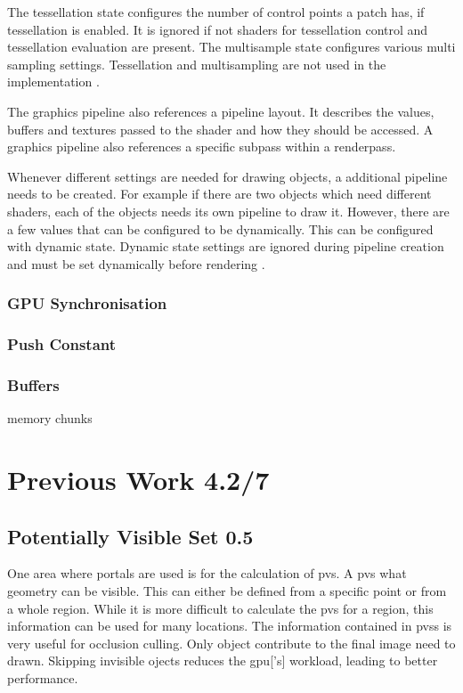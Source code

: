 The tessellation state configures the number of control points a patch has, if tessellation is enabled. It is ignored if not shaders for tessellation control and tessellation evaluation are present. The multisample state configures various multi sampling settings. Tessellation and multisampling are not used in the implementation \cite{khronos:vulkan:spec1.1}.

The graphics pipeline also references a pipeline layout. It describes the values, buffers and textures passed to the shader and how they should be accessed. A graphics pipeline also references a specific subpass within a renderpass\cite{khronos:vulkan:spec1.1}.

Whenever different settings are needed for drawing objects, a additional pipeline needs to be created. For example if there are two objects which need different shaders, each of the objects needs its own pipeline to draw it. However, there are a few values that can be configured to be dynamically. This can be configured with dynamic state. Dynamic state settings are ignored during pipeline creation and must be set dynamically before rendering \cite{khronos:vulkan:spec1.1}.


\subsubsection{GPU Synchronisation}



\subsubsection{Push Constant}



\subsubsection{Buffers}
memory chunks






\section{Previous Work 4.2/7}

\subsection{Potentially Visible Set 0.5}

One area where portals are used is for the calculation of \gls{pvs}. A \gls{pvs} what geometry can be visible. This can either be defined from a specific point or from a whole region. While it is more difficult to calculate the \gls{pvs} for a region, this information can be used for many locations. The information contained in \glspl{pvs} is very useful for occlusion culling. Only object contribute to the final image need to drawn. Skipping invisible ojects reduces the \gls{gpu}['s] workload, leading to better performance.

